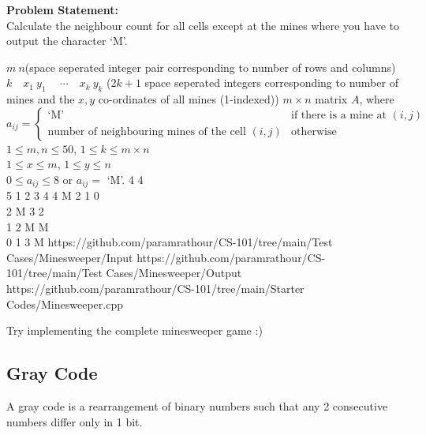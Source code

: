 \vspace{-2em}
\textbf{Problem Statement:}\\
Calculate the neighbour count for all cells except at the mines where you have to output the character `M'.%
\begin{testcasesMore}
	{%
	$m\ n$\hfill(space seperated integer pair corresponding to number of rows and columns)\\$k\quad x_1\ y_1\ \quad\cdots\quad x_{k}\ y_{k}$ \hfill($2k+1$ space seperated integers corresponding to number of mines and the $x,y$ co-ordinates of all mines (1-indexed))}
	{$m\times n$ matrix $A$, where $a_{ij}=\begin{cases}
		\text{`M'}& \text{if there is a mine at $(i,j)$} \\
		\text{number of neighbouring mines of the cell $(i,j)$} & \text{otherwise}
	\end{cases}$}
	{$1 \leq m,n \leq 50$, $1 \leq k \leq m\times n$\\$1 \leq x \leq m$, $1 \leq y \leq n$\\$0 \leq a_{ij} \leq 8$ or $a_{ij}=$ `M'.}%
	{4 4\\5 1  2  3 4 4}
	{M 2 1 0\\	2 M 3 2 \\	1 2 M M \\	0 1 3 M}
	{https://github.com/paramrathour/CS-101/tree/main/Test Cases/Minesweeper/Input}
	{https://github.com/paramrathour/CS-101/tree/main/Test Cases/Minesweeper/Output}
	{https://github.com/paramrathour/CS-101/tree/main/Starter Codes/Minesweeper.cpp}
\end{testcasesMore}
\begin{note}
	Try implementing the complete minesweeper game :)
\end{note}
\subsection{Gray Code}
A gray code is a rearrangement of binary numbers such that any 2 consecutive numbers differ only in 1 bit.

